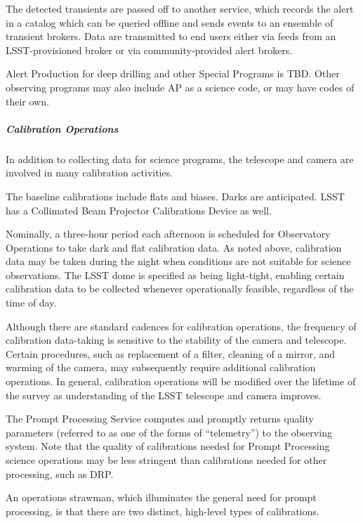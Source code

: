 The detected transients are passed off to another service, which
records the alert in a catalog which can be queried offline and sends
events to an ensemble of transient brokers. Data are transmitted to end
users either via feeds from an LSST-provisioned broker or via
community-provided alert brokers.

Alert Production for deep drilling and other Special Programs is TBD.
Other observing programs
may also include AP as a science code, or may have codes of their own.

\subparagraph{Calibration Operations}

In addition to collecting data for science programs, the telescope and
camera are involved in many calibration activities.

The baseline calibrations include flats and biases.  Darks are anticipated.  LSST has a Collimated Beam Projector Calibrations Device as well.

Nominally, a
three-hour period each afternoon is scheduled for Observatory Operations
to take dark and flat calibration data. As noted above, calibration data
may be taken during the night when conditions are not suitable for
science observations. The LSST dome is specified as being light-tight,
enabling certain calibration data to be collected whenever operationally
feasible, regardless of the time of day.

Although there are standard cadences for calibration operations, the
frequency of calibration data-taking is sensitive to the stability of
the camera and telescope. Certain procedures, such as replacement of a
filter, cleaning of a mirror, and warming of the camera, may
subsequently require additional calibration operations. In general,
calibration operations will be modified over the lifetime of the
survey as understanding of the LSST telescope and camera improves.

The Prompt Processing Service computes and promptly returns quality
parameters (referred to as one of the forms of “telemetry”) to the observing system. Note
that the quality of calibrations needed for Prompt Processing science
operations may be less stringent than calibrations needed for other
processing, such as DRP.

An operations strawman, which illuminates the general need for prompt
processing, is that there are two distinct, high-level types of
calibrations.

